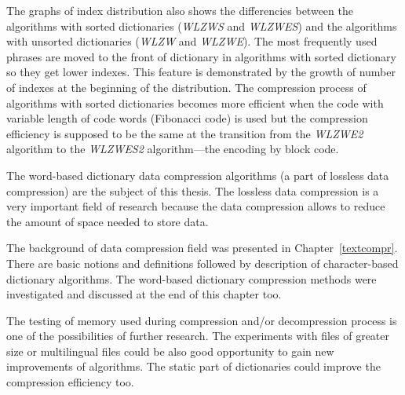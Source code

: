 \documentclass[thesis=M,english]{FITthesis}[2019/12/23]
\begin{document}
The graphs of index distribution also shows the differencies between the algorithms with sorted dictionaries (\textit{WLZWS} and \textit{WLZWES}) and the algorithms with unsorted dictionaries (\textit{WLZW} and \textit{WLZWE}). The most frequently used phrases are moved to the front of dictionary in algorithms with sorted dictionary so they get lower indexes. This feature is demonstrated by the growth of number of indexes at the beginning of the distribution. The compression process of algorithms with sorted dictionaries becomes more efficient when the code with variable length of code words (Fibonacci code) is used but the compression efficiency is supposed to be the same at the transition from the \textit{WLZWE2} algorithm to the \textit{WLZWES2} algorithm---the encoding by block code. 

\begin{conclusion}
	The word-based dictionary data compression algorithms (a part of lossless data compression) are the subject of this thesis. The lossless data compression is a very important field of research because the data compression allows to reduce the amount of space needed to store data.

	The background of data compression field was presented in Chapter~\ref{textcompr}. There are basic notions and definitions followed by description of character-based dictionary algorithms. The word-based dictionary compression methods were investigated and discussed at the end of this chapter too.


	The testing of memory used during compression and/or decompression process is one of the possibilities of further research. The experiments with files of greater size or multilingual files could be also good opportunity to gain new improvements of algorithms. The static part of dictionaries could improve the compression efficiency too.


\end{conclusion}
\end{document}
